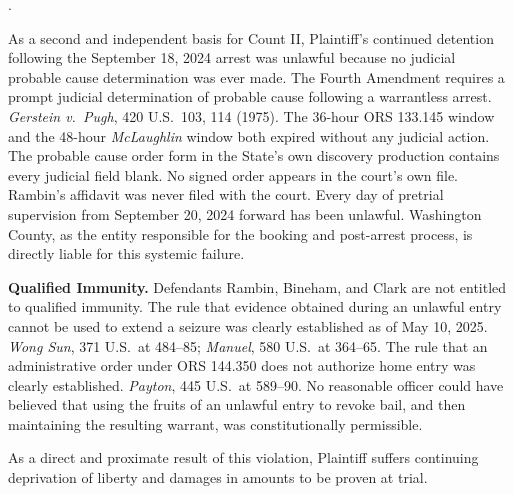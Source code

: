 \documentclass[12pt,letterpaper]{article}
\newcounter{complaintpara}
\newenvironment{paras}{%
	\begin{list}{\arabic{complaintpara}.}{%
			\setlength{\leftmargin}{0.5in}%
			\setlength{\labelwidth}{0.4in}%
			\setlength{\labelsep}{0.1in}%
			\setlength{\itemsep}{0pt}%
			\setlength{\parsep}{0pt}%
			\setlength{\topsep}{6pt}%
		}%
	}{%
	\end{list}%
}
\begin{document}
\begin{paras}
		\item As a second and independent basis for Count II, Plaintiff's continued detention following the September 18, 2024 arrest was unlawful because no judicial probable cause determination was ever made. The Fourth Amendment requires a prompt judicial determination of probable cause following a warrantless arrest. \textit{Gerstein v.\ Pugh}, 420 U.S.\ 103, 114 (1975). The 36-hour ORS 133.145 window and the 48-hour \textit{McLaughlin} window both expired without any judicial action. The probable cause order form in the State's own discovery production contains every judicial field blank. No signed order appears in the court's own file. Rambin's affidavit was never filed with the court. Every day of pretrial supervision from September 20, 2024 forward has been unlawful. Washington County, as the entity responsible for the booking and post-arrest process, is directly liable for this systemic failure.
		\item \textbf{Qualified Immunity.} Defendants Rambin, Bineham,
		and Clark are not entitled to qualified immunity. The rule
		that evidence obtained during an unlawful entry cannot be
		used to extend a seizure was clearly established as of
		May 10, 2025. \textit{Wong Sun}, 371 U.S.\ at 484--85;
		\textit{Manuel}, 580 U.S.\ at 364--65. The rule that an
		administrative order under ORS 144.350 does not authorize
		home entry was clearly established. \textit{Payton},
		445 U.S.\ at 589--90. No reasonable officer could have
		believed that using the fruits of an unlawful entry to
		revoke bail, and then maintaining the resulting warrant,
		was constitutionally permissible.
		
		\item As a direct and proximate result of this violation,
		Plaintiff suffers continuing deprivation of liberty and
		damages in amounts to be proven at trial.
		
	\end{paras}
\end{document}
